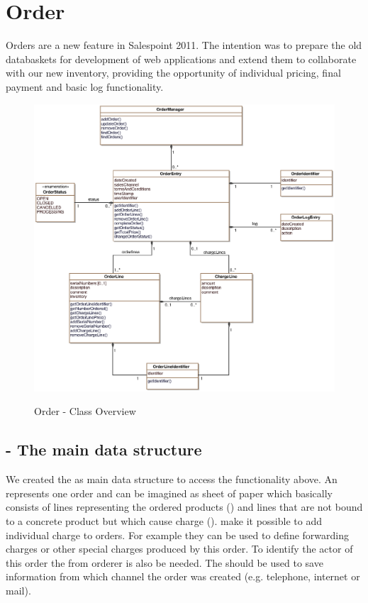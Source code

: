 \newpage
\section{Order}
Orders are a new feature in Salespoint 2011. The intention was to prepare the old databaskets for development of web applications and extend them to collaborate with our new inventory, providing the opportunity of individual pricing, final payment and basic log functionality.

\begin{figure}[ht]
	\centering
  \includegraphics[scale =.7]{images/Overview_Order.eps}
	\label{order_overview}
	\caption{Order - Class Overview}
\end{figure}

\subsection{ - The main data structure}
We created the  as main data structure to access the functionality above. An  represents one order and can be imagined as sheet of paper which basically consists of lines representing the ordered products () and lines that are not bound to a concrete product but which cause charge ().  make it possible to add individual charge to orders. For example they can be used to define forwarding charges or other special charges produced by this order.
To identify the actor of this order the  from orderer is also be needed. The  should be used to save information from which channel the order was created (e.g. telephone, internet or mail).

